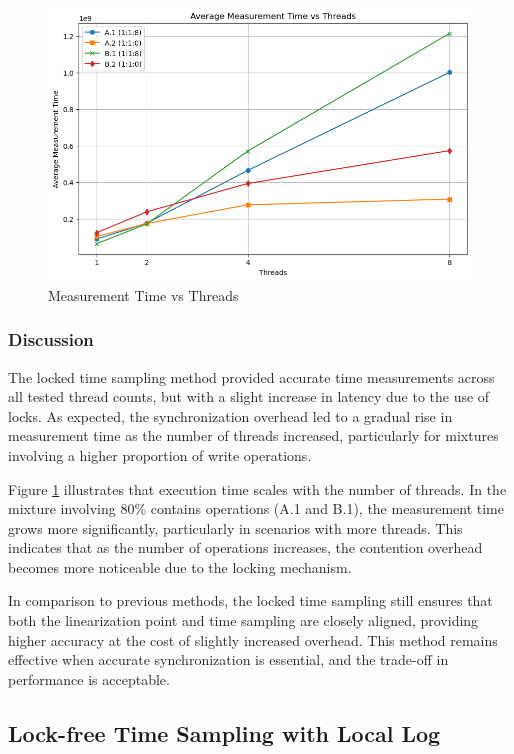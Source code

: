\documentclass{article}
\begin{document}
\begin{figure}[H]
    \centering
    \includegraphics[width=\textwidth]{LaTex/images/Lab 3 2.3.2.1.png}
    \caption{Measurement Time vs Threads}
    \label{fig:fig5}
\end{figure}

\subsubsection{Discussion}
The locked time sampling method provided accurate time measurements across all tested thread counts, but with a slight increase in latency due to the use of locks. As expected, the synchronization overhead led to a gradual rise in measurement time as the number of threads increased, particularly for mixtures involving a higher proportion of write operations.

Figure \ref{fig:fig5} illustrates that execution time scales with the number of threads. In the mixture involving 80\% contains operations (A.1 and B.1), the measurement time grows more significantly, particularly in scenarios with more threads. This indicates that as the number of operations increases, the contention overhead becomes more noticeable due to the locking mechanism.

In comparison to previous methods, the locked time sampling still ensures that both the linearization point and time sampling are closely aligned, providing higher accuracy at the cost of slightly increased overhead. This method remains effective when accurate synchronization is essential, and the trade-off in performance is acceptable.

\newpage
\subsection{Lock-free Time Sampling with Local Log}
\end{document}
